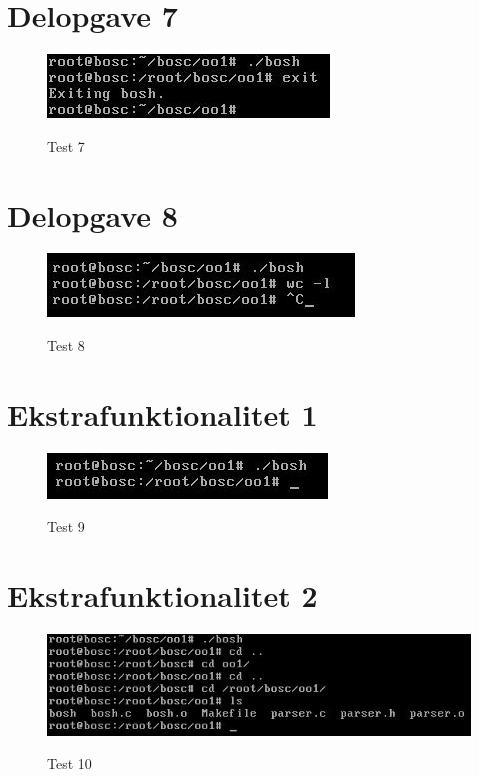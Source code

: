 \section{Delopgave 7}
\begin{figure}[!h]
\centering
\caption{Test 7}
\includegraphics{Images/TestOfPart7}
\label{Test7}
\end{figure}

\section{Delopgave 8}
\begin{figure}[!h]
\centering
\caption{Test 8}
\includegraphics{Images/TestOfPart8}
\label{Test8}
\end{figure}

\section{Ekstrafunktionalitet 1}
\begin{figure}[!h]
\centering
\caption{Test 9}
\includegraphics{Images/TestOfPart9}
\label{Test9}
\end{figure}

\section{Ekstrafunktionalitet 2}
\begin{figure}[!h]
\centering
\caption{Test 10}
\includegraphics{Images/TestOfPart10}
\label{Test10}
\end{figure}